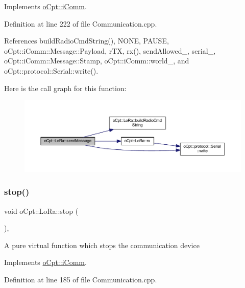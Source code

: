 Implements \hyperlink{classo_cpt_1_1i_comm_aed3d4364175d17efc0347b6e954f5aef}{o\+Cpt\+::i\+Comm}.



Definition at line 222 of file Communication.\+cpp.



References build\+Radio\+Cmd\+String(), N\+O\+NE, P\+A\+U\+SE, o\+Cpt\+::i\+Comm\+::\+Message\+::\+Payload, r\+TX, rx(), send\+Allowed\+\_\+, serial\+\_\+, o\+Cpt\+::i\+Comm\+::\+Message\+::\+Stamp, o\+Cpt\+::i\+Comm\+::world\+\_\+, and o\+Cpt\+::protocol\+::\+Serial\+::write().

Here is the call graph for this function\+:\nopagebreak
\begin{figure}[H]
\begin{center}
\leavevmode
\includegraphics[width=350pt]{classo_cpt_1_1_lo_ra_a053e29e992490cffb90741c009664272_cgraph}
\end{center}
\end{figure}
\hypertarget{classo_cpt_1_1_lo_ra_a8300de2590a7ce8b56863eb4059f14ad}{}\label{classo_cpt_1_1_lo_ra_a8300de2590a7ce8b56863eb4059f14ad} 
\subsubsection{\texorpdfstring{stop()}{stop()}}
{\footnotesize\ttfamily void o\+Cpt\+::\+Lo\+Ra\+::stop (\begin{DoxyParamCaption}{ }\end{DoxyParamCaption})\hspace{0.3cm}{\ttfamily [override]}, {\ttfamily [virtual]}}

A pure virtual function which stops the communication device 

Implements \hyperlink{classo_cpt_1_1i_comm_ad73564bd03146a576aaa37db1a38379f}{o\+Cpt\+::i\+Comm}.



Definition at line 185 of file Communication.\+cpp.


